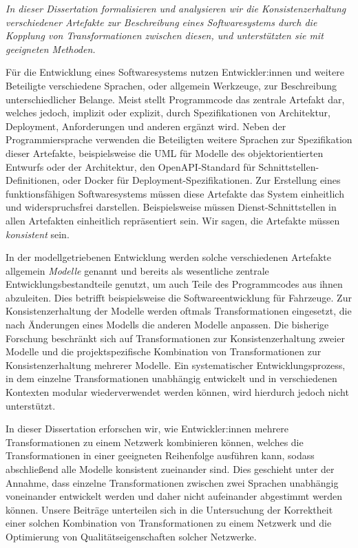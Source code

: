 \emph{In dieser Dissertation formalisieren und analysieren wir die Konsistenzerhaltung verschiedener Artefakte zur Beschreibung eines Softwaresystems durch die Kopplung von Transformationen zwischen diesen, und unterstützten sie mit geeigneten Methoden.}

Für die Entwicklung eines Softwaresystems nutzen Entwickler:innen und weitere Beteiligte verschiedene Sprachen, oder allgemein Werkzeuge, zur Beschreibung unterschiedlicher Belange.
Meist stellt Programmcode das zentrale Artefakt dar, welches jedoch, implizit oder explizit, durch Spezifikationen von Architektur, Deployment, Anforderungen und anderen ergänzt wird.
Neben der Programmiersprache verwenden die Beteiligten weitere Sprachen zur Spezifikation dieser Artefakte, beispielsweise die \acrshort{UML} für Modelle des objektorientierten Entwurfs oder der Architektur, den OpenAPI-Standard für Schnittstellen-Definitionen, oder Docker für Deployment-Spezifikationen.
Zur Erstellung eines funktionsfähigen Softwaresystems müssen diese Artefakte das System einheitlich und widerspruchsfrei darstellen.
Beispielsweise müssen Dienst-Schnittstellen in allen Artefakten einheitlich repräsentiert sein.
Wir sagen, die Artefakte müssen \emph{konsistent} sein.

In der modellgetriebenen Entwicklung werden solche verschiedenen Artefakte allgemein \emph{Modelle} genannt und bereits als wesentliche zentrale Entwicklungsbestandteile genutzt, um auch Teile des Programmcodes aus ihnen abzuleiten.
Dies betrifft beispielsweise die Softwareentwicklung für Fahrzeuge. %
Zur Konsistenzerhaltung der Modelle werden oftmals Transformationen eingesetzt, die nach Änderungen eines Modells die anderen Modelle anpassen.
Die bisherige Forschung beschränkt sich auf Transformationen zur Konsistenzerhaltung zweier Modelle %
und die projektspezifische Kombination von Transformationen zur Konsistenzerhaltung mehrerer Modelle. %
Ein systematischer Entwicklungsprozess, in dem einzelne Transformationen unabhängig entwickelt und in verschiedenen Kontexten modular wiederverwendet werden können, wird hierdurch jedoch nicht unterstützt.

In dieser Dissertation erforschen wir, wie Entwickler:innen mehrere Transformationen zu einem Netzwerk kombinieren können, welches die Transformationen in einer geeigneten Reihenfolge ausführen kann, sodass abschließend alle Modelle konsistent zueinander sind. %
Dies geschieht unter der Annahme, dass einzelne Transformationen zwischen zwei Sprachen unabhängig voneinander entwickelt werden und daher nicht aufeinander abgestimmt werden können.
Unsere Beiträge unterteilen sich in die Untersuchung der Korrektheit einer solchen Kombination von Transformationen zu einem Netzwerk und die Optimierung von Qualitätseigenschaften solcher Netzwerke.

